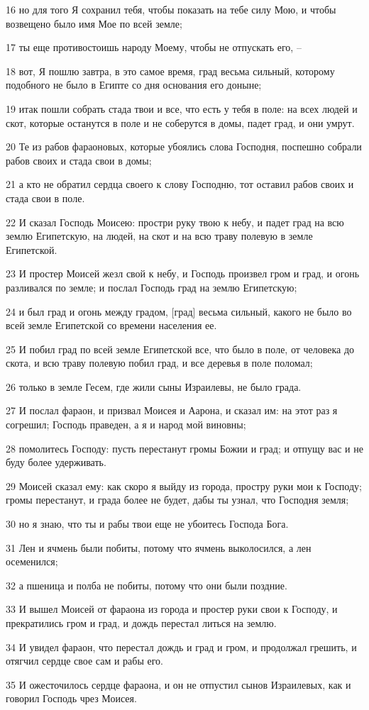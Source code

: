 \par 16 но для того Я сохранил тебя, чтобы показать на тебе силу Мою, и чтобы возвещено было имя Мое по всей земле;
\par 17 ты еще противостоишь народу Моему, чтобы не отпускать его, --
\par 18 вот, Я пошлю завтра, в это самое время, град весьма сильный, которому подобного не было в Египте со дня основания его доныне;
\par 19 итак пошли собрать стада твои и все, что есть у тебя в поле: на всех людей и скот, которые останутся в поле и не соберутся в домы, падет град, и они умрут.
\par 20 Те из рабов фараоновых, которые убоялись слова Господня, поспешно собрали рабов своих и стада свои в домы;
\par 21 а кто не обратил сердца своего к слову Господню, тот оставил рабов своих и стада свои в поле.
\par 22 И сказал Господь Моисею: простри руку твою к небу, и падет град на всю землю Египетскую, на людей, на скот и на всю траву полевую в земле Египетской.
\par 23 И простер Моисей жезл свой к небу, и Господь произвел гром и град, и огонь разливался по земле; и послал Господь град на землю Египетскую;
\par 24 и был град и огонь между градом, [град] весьма сильный, какого не было во всей земле Египетской со времени населения ее.
\par 25 И побил град по всей земле Египетской все, что было в поле, от человека до скота, и всю траву полевую побил град, и все деревья в поле поломал;
\par 26 только в земле Гесем, где жили сыны Израилевы, не было града.
\par 27 И послал фараон, и призвал Моисея и Аарона, и сказал им: на этот раз я согрешил; Господь праведен, а я и народ мой виновны;
\par 28 помолитесь Господу: пусть перестанут громы Божии и град; и отпущу вас и не буду более удерживать.
\par 29 Моисей сказал ему: как скоро я выйду из города, простру руки мои к Господу; громы перестанут, и града более не будет, дабы ты узнал, что Господня земля;
\par 30 но я знаю, что ты и рабы твои еще не убоитесь Господа Бога.
\par 31 Лен и ячмень были побиты, потому что ячмень выколосился, а лен осеменился;
\par 32 а пшеница и полба не побиты, потому что они были поздние.
\par 33 И вышел Моисей от фараона из города и простер руки свои к Господу, и прекратились гром и град, и дождь перестал литься на землю.
\par 34 И увидел фараон, что перестал дождь и град и гром, и продолжал грешить, и отягчил сердце свое сам и рабы его.
\par 35 И ожесточилось сердце фараона, и он не отпустил сынов Израилевых, как и говорил Господь чрез Моисея.

